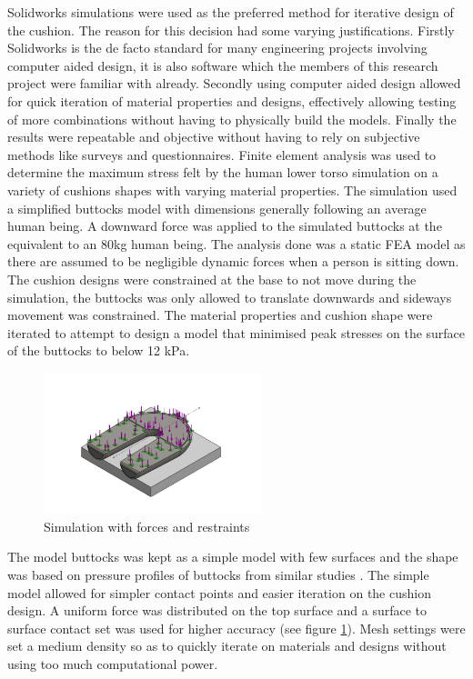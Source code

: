 \documentclass[conference]{IEEEtran}
\begin{document}
Solidworks simulations were used as the preferred method for iterative design of the cushion. The reason for this decision had some varying justifications. Firstly Solidworks is the de facto standard for many engineering projects involving computer aided design, it is also software which the members of this research project were familiar with already. Secondly using computer aided design allowed for quick iteration of material properties and designs, effectively allowing testing of more combinations without having to physically build the models. Finally the results were repeatable and objective without having to rely on subjective methods like surveys and questionnaires. Finite element analysis was used to determine the maximum stress felt by the human lower torso simulation on a variety of cushions shapes with varying material properties. The simulation used a simplified buttocks model with dimensions generally following an average human being. A downward force was applied to the simulated buttocks at the equivalent to an 80kg human being. The analysis done was a static FEA model as there are assumed to be negligible dynamic forces when a person is sitting down. The cushion designs were constrained at the base to not move during the simulation, the buttocks was only allowed to translate downwards and sideways movement was constrained. The material properties and cushion shape were iterated to attempt to design a model that minimised peak stresses on the surface of the buttocks to below 12 kPa.

\begin{figure}[!t]
\centering
 \includegraphics[width=2.5in]{pics/simulation.png}
    \caption{Simulation with forces and restraints}
    \label{simulation}
\end{figure}

The model buttocks was kept as a simple model with few surfaces and the shape was based on pressure profiles of buttocks from similar studies \cite{HermanMiller2013,Grujicic2009}. The simple model allowed for simpler contact points and easier iteration on the cushion design. A uniform force was distributed on the top surface and a surface to surface contact set was used for higher accuracy (see figure \ref{simulation}). Mesh settings were set a medium density so as to quickly iterate on materials and designs without using too much computational power. 
\end{document}
